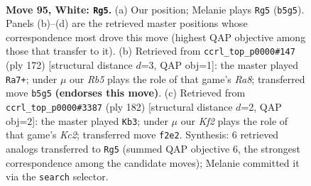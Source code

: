 \documentclass[11pt]{article}
\begin{document}
\clearpage

\begin{figure}[p]\centering
\begin{subfigure}{0.46\textwidth}\centering
\resizebox{\linewidth}{!}{%
\newchessgame
\chessboard[
  setfen={8/2k5/8/1R6/7r/r7/5K2/8 w - - 0 95},
  showmover=false,
  pgfstyle=straightmove, color=movearrow, markmove={b5-g5}
]}
\caption{}
\end{subfigure}\hfill
\begin{subfigure}{0.46\textwidth}\centering
\resizebox{\linewidth}{!}{%
\newchessgame
\chessboard[
  setfen={R7/2k5/8/8/6r1/8/4K3/8 w - - 4 87},
  showmover=false,
  pgfstyle=straightmove, color=movearrow, markmove={a8-a7}
]}
\caption{}
\end{subfigure}
\\[4pt]
\begin{subfigure}{0.46\textwidth}\centering
\resizebox{\linewidth}{!}{%
\newchessgame
\chessboard[
  setfen={1R6/r7/3r4/8/7R/8/2K3k1/8 w - - 18 92},
  showmover=false,
  pgfstyle=straightmove, color=movearrow, markmove={c2-b3}
]}
\caption{}
\end{subfigure}\hfill

\caption{\textbf{Move 95, White: \texttt{Rg5}.} (a) Our position; Melanie plays \texttt{Rg5} (\texttt{b5g5}). Panels (b)--(d) are the retrieved master positions whose correspondence most drove this move (highest QAP objective among those that transfer to it). (b) Retrieved from \texttt{ccrl\_top\_p0000\#147} (ply 172) [structural distance $d$=3, QAP obj=1]: the master played \texttt{Ra7+}; under $\mu$ our \emph{Rb5} plays the role of that game's \emph{Ra8}; transferred move \texttt{b5g5} \textbf{(endorses this move)}. (c) Retrieved from \texttt{ccrl\_top\_p0000\#3387} (ply 182) [structural distance $d$=2, QAP obj=2]: the master played \texttt{Kb3}; under $\mu$ our \emph{Kf2} plays the role of that game's \emph{Kc2}; transferred move \texttt{f2e2}. Synthesis: 6 retrieved analogs transferred to \texttt{Rg5} (summed QAP objective 6, the strongest correspondence among the candidate moves); Melanie committed it via the \texttt{search} selector.}
\label{fig:thought-m188}
\end{figure}

\clearpage
\end{document}

